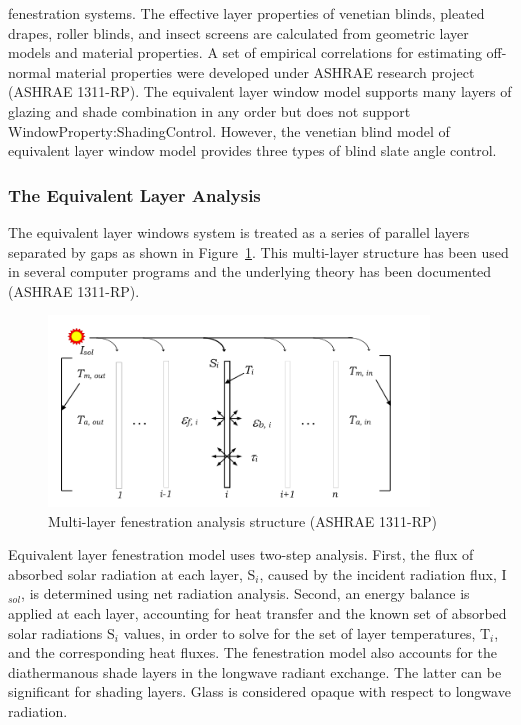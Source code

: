 fenestration systems. The effective layer properties of venetian blinds, pleated drapes, roller blinds, and insect screens are calculated from geometric layer models and material properties. A set of empirical correlations for estimating off-normal material properties were developed under ASHRAE research project (ASHRAE 1311-RP). The equivalent layer window model supports many layers of glazing and shade combination in any order but does not support WindowProperty:ShadingControl. However, the venetian blind model of equivalent layer window model provides three types of blind slate angle control.

\subsubsection{The Equivalent Layer Analysis}\label{the-equivalent-layer-analysis}

The equivalent layer windows system is treated as a series of parallel layers separated by gaps as shown in Figure~\ref{fig:multi-layer-fenestration-analysis-structure}. This multi-layer structure has been used in several computer programs and the underlying theory has been documented (ASHRAE 1311-RP).

\begin{figure}[hbtp] %
\centering
\includegraphics[width=0.9\textwidth, height=0.9\textheight, keepaspectratio=true]{media/image1827.svg.png}
\caption{Multi-layer fenestration analysis structure (ASHRAE 1311-RP) \protect \label{fig:multi-layer-fenestration-analysis-structure}}
\end{figure}

Equivalent layer fenestration model uses two-step analysis. First, the flux of absorbed solar radiation at each layer, S\(_{i}\), caused by the incident radiation flux, I\(_{sol}\), is determined using net radiation analysis. Second, an energy balance is applied at each layer, accounting for heat transfer and the known set of absorbed solar radiations S\(_{i}\) values, in order to solve for the set of layer temperatures, T\(_{i}\), and the corresponding heat fluxes. The fenestration model also accounts for the diathermanous shade layers in the longwave radiant exchange. The latter can be significant for shading layers. Glass is considered opaque with respect to longwave radiation.

